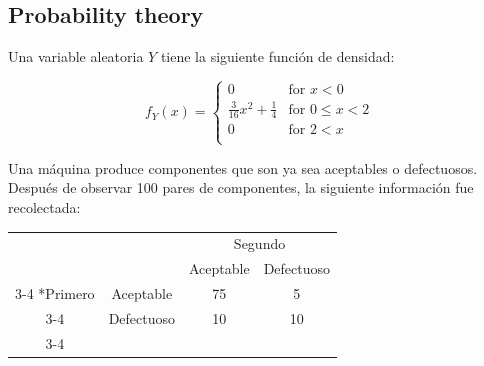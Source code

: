 \documentclass[11pt]{exam}
\begin{document}
%
%
%
\begin{questions}
\section*{Probability theory}
\addpoints
\question Una variable aleatoria $Y$ tiene la siguiente funci\'on de densidad:

 \[f_Y(x)=
\begin{cases}
0&\text{for $x < 0$}\\
\frac{3}{16}x^2+\frac{1}{4}& \text{for $0\leq x < 2$}\\
0&\text{for $2 < x$}\\
\end{cases}
\]


\newpage
\addpoints
\question Una m\'aquina produce componentes que son ya sea aceptables o defectuosos. Despu\'es de observar 100 pares de componentes, la siguiente informaci\'on fue recolectada:


 \begin{table}[h!]
	\centering
    \setlength{\extrarowheight}{2pt}
    \begin{tabular}{cc|c|c|}
      & \multicolumn{1}{c}{} & \multicolumn{2}{c}{Segundo}\\
      & \multicolumn{1}{c}{} & \multicolumn{1}{c}{Aceptable}  & \multicolumn{1}{c}{Defectuoso} \\\cline{3-4}
      \multirow{2}*{Primero}  & Aceptable & 75 & 5 \\\cline{3-4}
      & Defectuoso & 10 & 10 \\\cline{3-4}
    \end{tabular}
  \end{table}



\end{questions}
\end{document}
